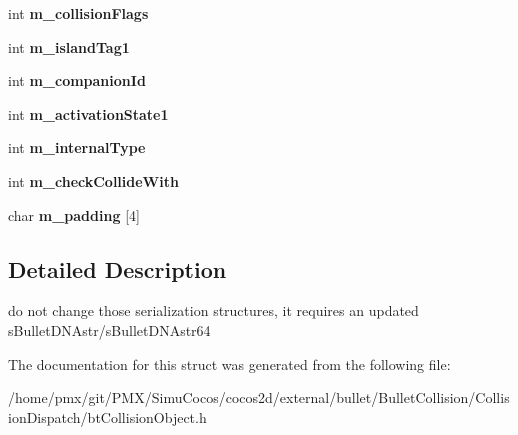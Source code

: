 \begin{DoxyCompactItemize}
\item 
\mbox{\label{structbtCollisionObjectDoubleData_a6f954bbcd5e806e7c51dfcf4314f5b39}} 
int {\bfseries m\+\_\+collision\+Flags}
\item 
\mbox{\label{structbtCollisionObjectDoubleData_ad6d5d8c47f6876ef2f2b3c1de0bd3280}} 
int {\bfseries m\+\_\+island\+Tag1}
\item 
\mbox{\label{structbtCollisionObjectDoubleData_ae0356e860626b042242c51568eb3f5f7}} 
int {\bfseries m\+\_\+companion\+Id}
\item 
\mbox{\label{structbtCollisionObjectDoubleData_ac8a7e24234fde349624f52885d13cf98}} 
int {\bfseries m\+\_\+activation\+State1}
\item 
\mbox{\label{structbtCollisionObjectDoubleData_a1647e762dc61c0147862b4fbf42221c5}} 
int {\bfseries m\+\_\+internal\+Type}
\item 
\mbox{\label{structbtCollisionObjectDoubleData_abb1b716569e08c0e8c769518c833d30e}} 
int {\bfseries m\+\_\+check\+Collide\+With}
\item 
\mbox{\label{structbtCollisionObjectDoubleData_a667c8914ec964fc891f4e03fa97834ac}} 
char {\bfseries m\+\_\+padding} \mbox{[}4\mbox{]}
\end{DoxyCompactItemize}


\subsection{Detailed Description}
do not change those serialization structures, it requires an updated s\+Bullet\+D\+N\+Astr/s\+Bullet\+D\+N\+Astr64 

The documentation for this struct was generated from the following file\+:\begin{DoxyCompactItemize}
\item 
/home/pmx/git/\+P\+M\+X/\+Simu\+Cocos/cocos2d/external/bullet/\+Bullet\+Collision/\+Collision\+Dispatch/bt\+Collision\+Object.\+h\end{DoxyCompactItemize}
